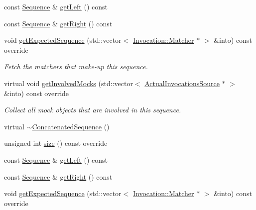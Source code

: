 \begin{DoxyCompactItemize}
\item 
const \mbox{\hyperlink{classfakeit_1_1Sequence}{Sequence}} \& \mbox{\hyperlink{classfakeit_1_1ConcatenatedSequence_aee102fbcc892783441a36082e1a22789}{get\+Left}} () const
\item 
const \mbox{\hyperlink{classfakeit_1_1Sequence}{Sequence}} \& \mbox{\hyperlink{classfakeit_1_1ConcatenatedSequence_a7b1ed9161c972e43fdf2e4cfecbe5bd7}{get\+Right}} () const
\item 
void \mbox{\hyperlink{classfakeit_1_1ConcatenatedSequence_a176b1d4dac2e552f646c2c3ce98f0d1f}{get\+Expected\+Sequence}} (std\+::vector$<$ \mbox{\hyperlink{structfakeit_1_1Invocation_1_1Matcher}{Invocation\+::\+Matcher}} $\ast$ $>$ \&into) const override
\begin{DoxyCompactList}\small\item\em Fetch the matchers that make-\/up this sequence. \end{DoxyCompactList}\item 
virtual void \mbox{\hyperlink{classfakeit_1_1ConcatenatedSequence_a3b475e68ab4f750f2d4946e4777ebe30}{get\+Involved\+Mocks}} (std\+::vector$<$ \mbox{\hyperlink{structfakeit_1_1ActualInvocationsSource}{Actual\+Invocations\+Source}} $\ast$ $>$ \&into) const override
\begin{DoxyCompactList}\small\item\em Collect all mock objects that are involved in this sequence. \end{DoxyCompactList}\item 
virtual \mbox{\hyperlink{classfakeit_1_1ConcatenatedSequence_a22346ae8c3c2af91f26144338750be25}{$\sim$\+Concatenated\+Sequence}} ()
\item 
unsigned int \mbox{\hyperlink{classfakeit_1_1ConcatenatedSequence_aa1dba1b0274b30626ceab3a743c8105a}{size}} () const override
\item 
const \mbox{\hyperlink{classfakeit_1_1Sequence}{Sequence}} \& \mbox{\hyperlink{classfakeit_1_1ConcatenatedSequence_aee102fbcc892783441a36082e1a22789}{get\+Left}} () const
\item 
const \mbox{\hyperlink{classfakeit_1_1Sequence}{Sequence}} \& \mbox{\hyperlink{classfakeit_1_1ConcatenatedSequence_a7b1ed9161c972e43fdf2e4cfecbe5bd7}{get\+Right}} () const
\item 
void \mbox{\hyperlink{classfakeit_1_1ConcatenatedSequence_a176b1d4dac2e552f646c2c3ce98f0d1f}{get\+Expected\+Sequence}} (std\+::vector$<$ \mbox{\hyperlink{structfakeit_1_1Invocation_1_1Matcher}{Invocation\+::\+Matcher}} $\ast$ $>$ \&into) const override

\end{DoxyCompactItemize}
